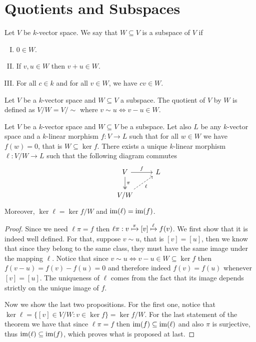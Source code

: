 \section{Quotients and Subspaces}

\begin{definition}[Subspace]\label{def: subspace}
Let \(V\) be \(k\)-vector space. We say that \(W \subseteq  V\) is a subspace
of \(V\) if
\begin{enumerate}[I.]
  \item \(0 \in W\).
  \item If \(v, u \in W\) then \(v + u \in W\).
  \item For all \(c \in k\) and for all \(v \in W\), we have \(cv \in W\).
\end{enumerate}
\end{definition}

\begin{definition}[Quotient]\label{def: quotient}
  Let \(V\) be a \(k\)-vector space and \(W \subseteq V\) a subspace. The
  quotient of \(V\) by \(W\) is defined as \(V/W = V/{\sim}\) where \(v
  \sim u \Leftrightarrow v - u \in W\).
\end{definition}

\begin{theorem}
\label{thm: universal property for quotients}
Let \(V\) be a \(k\)-vector space and \(W \subseteq V\) be a subspace. Let
also \(L\) be any \(k\)-vector space and a \(k\)-linear morphism \(f : V \to L
\) such that for all \(w \in W\) we have \(f(w) = 0\), that is \(W \subseteq \ker f\).
There exists a unique \(k\)-linear morphism \(\ell: V/W \to L\) such that the
following diagram commutes
\[
  \begin{tikzcd}
      &V \ar["f", r] \ar["\pi", twoheadrightarrow, d] &L \\
      &V/W \ar[swap, dashed, "\ell", ru]
  \end{tikzcd}
\]
Moreover, \(\ker \ell = \ker f / W\) and  \(\operatorname{im}(\ell) = \operatorname{im}(f)\).
\end{theorem}

\begin{proof}
Since we need \(\ell  \pi = f\) then \(\ell  \pi : v \xmapsto \pi
[v] \xmapsto \ell f(v)\). We first show that it is indeed well
defined. For that, suppose \(v \sim u\), that is \([v] =
[u]\), then we know that since they belong to the same class, they must have the
same image under the mapping \(\ell\). Notice that since \(v \sim u
\Leftrightarrow v - u \in W \subseteq \ker f\) then \(f(v - u) = f(v) - f(u) =
0\) and therefore indeed \(f(v) = f(u)\) whenever \([v] =
[u]\). The uniqueness of \(\ell\) comes from the fact that its image depends
strictly on the unique image of \(f\).

Now we show the last two propositions. For the first one, notice that \(\ker
\ell = \{[v] \in V/W \colon v \in \ker f\} = \ker f / W\). For the last
statement of the theorem we have that since \(\ell  \pi = f\) then
\(\operatorname{im}(f) \subseteq \operatorname{im}(\ell)\) and also \(\pi\) is surjective, thus
\(\operatorname{im}(\ell) \subseteq \operatorname{im}(f)\), which proves what is proposed at last.
\end{proof}

